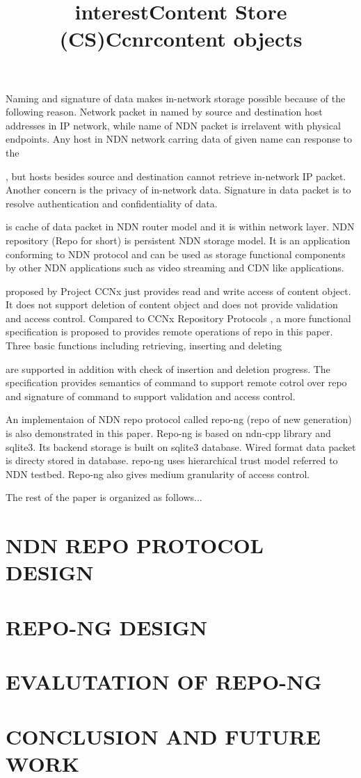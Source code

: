 \documentclass{acm_proc_article-sp}
\begin{document}
Naming and signature of data makes in-network storage possible because of the following reason. Network packet in named by source and destination host addresses in IP network, while name of NDN packet is irrelavent with physical endpoints. Any host in NDN network carring data of given name can response to the \title{interest}, but hosts besides source and destination cannot retrieve in-network IP packet. Another concern is the privacy of in-network data. Signature in data packet is to resolve authentication and confidentiality of data. \title{Content Store (CS)} is cache of data packet in NDN router model and it is within network layer. NDN repository (Repo for short) is persistent NDN storage model. It is an application conforming to NDN protocol and can be used as storage functional components by other NDN applications such as video streaming and CDN like applications.

\title{Ccnr} proposed by Project CCNx just provides read and write access of content object. It does not support deletion of content object and does not provide validation and access control. Compared to CCNx Repository Protocols \cite{ccnr}, a more functional specification is proposed to provides remote operations of repo in this paper. Three basic functions including retrieving, inserting and deleting \title{content objects} are supported in addition with check of insertion and deletion progress. The specification provides semantics of command to support remote cotrol over repo and signature of command to support validation and access control.

An implementaion of NDN repo protocol called repo-ng (repo of new generation) is also demonstrated in this paper. Repo-ng is based on ndn-cpp library and sqlite3. Its backend storage is built on sqlite3 database. Wired format data packet is directy stored in database. repo-ng uses hierarchical trust model referred to NDN testbed. \cite{ndn-key} Repo-ng also gives medium granularity of access control.

The rest of the paper is organized as follows...

\section{NDN REPO PROTOCOL DESIGN}

\section{REPO-NG DESIGN}

\section{EVALUTATION OF REPO-NG}

\section{CONCLUSION AND FUTURE WORK}



\end{document}
